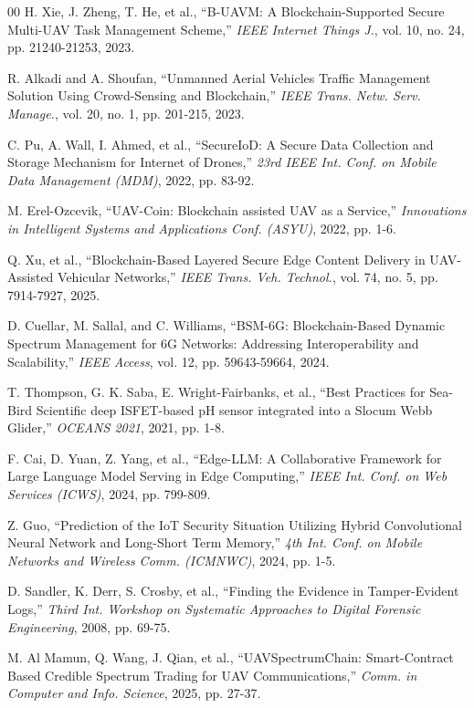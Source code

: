 \documentclass[preprint,12pt]{elsarticle}
\begin{document}
\begin{thebibliography}{00}
 H. Xie, J. Zheng, T. He, et al., ``B-UAVM: A Blockchain-Supported Secure Multi-UAV Task Management Scheme,'' \textit{IEEE Internet Things J.}, vol. 10, no. 24, pp. 21240-21253, 2023.

 R. Alkadi and A. Shoufan, ``Unmanned Aerial Vehicles Traffic Management Solution Using Crowd-Sensing and Blockchain,'' \textit{IEEE Trans. Netw. Serv. Manage.}, vol. 20, no. 1, pp. 201-215, 2023.

 C. Pu, A. Wall, I. Ahmed, et al., ``SecureIoD: A Secure Data Collection and Storage Mechanism for Internet of Drones,'' \textit{23rd IEEE Int. Conf. on Mobile Data Management (MDM)}, 2022, pp. 83-92.

 M. Erel-Ozcevik, ``UAV-Coin: Blockchain assisted UAV as a Service,'' \textit{Innovations in Intelligent Systems and Applications Conf. (ASYU)}, 2022, pp. 1-6.

 Q. Xu, et al., ``Blockchain-Based Layered Secure Edge Content Delivery in UAV-Assisted Vehicular Networks,'' \textit{IEEE Trans. Veh. Technol.}, vol. 74, no. 5, pp. 7914-7927, 2025.

 D. Cuellar, M. Sallal, and C. Williams, ``BSM-6G: Blockchain-Based Dynamic Spectrum Management for 6G Networks: Addressing Interoperability and Scalability,'' \textit{IEEE Access}, vol. 12, pp. 59643-59664, 2024.

 T. Thompson, G. K. Saba, E. Wright-Fairbanks, et al., ``Best Practices for Sea-Bird Scientific deep ISFET-based pH sensor integrated into a Slocum Webb Glider,'' \textit{OCEANS 2021}, 2021, pp. 1-8.

 F. Cai, D. Yuan, Z. Yang, et al., ``Edge-LLM: A Collaborative Framework for Large Language Model Serving in Edge Computing,'' \textit{IEEE Int. Conf. on Web Services (ICWS)}, 2024, pp. 799-809.

 Z. Guo, ``Prediction of the IoT Security Situation Utilizing Hybrid Convolutional Neural Network and Long-Short Term Memory,'' \textit{4th Int. Conf. on Mobile Networks and Wireless Comm. (ICMNWC)}, 2024, pp. 1-5.

 D. Sandler, K. Derr, S. Crosby, et al., ``Finding the Evidence in Tamper-Evident Logs,'' \textit{Third Int. Workshop on Systematic Approaches to Digital Forensic Engineering}, 2008, pp. 69-75.

 M. Al Mamun, Q. Wang, J. Qian, et al., ``UAVSpectrumChain: Smart-Contract Based Credible Spectrum Trading for UAV Communications,'' \textit{Comm. in Computer and Info. Science}, 2025, pp. 27-37.


\end{thebibliography}
\end{document}
